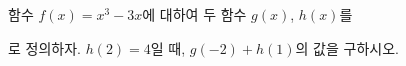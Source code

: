 함수 $f(x)=x^3-3x$에 대하여 두 함수 $g(x)$, $h(x)$를\par\smallskip{}\par\smallskip\noindent 로 정의하자. $h(2)=4$일 때, $g(-2)+h(1)$의 값을 구하시오.
